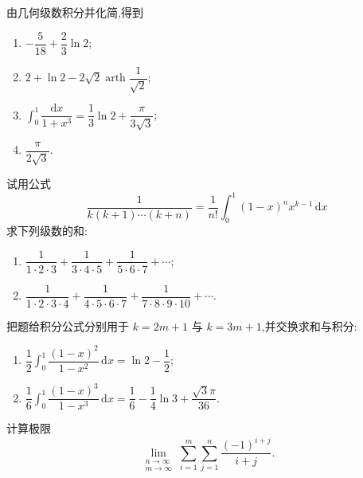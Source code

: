 \begin{solution}
    由几何级数积分并化简,得到
    \begin{enumerate}
        \item $\displaystyle -\dfrac{5}{18}+\dfrac{2}{3}\ln2$;
        \item $\displaystyle 2+\ln2-2\sqrt2\operatorname{arth}\dfrac{1}{\sqrt2}$;
        \item $\displaystyle \int_0^1\dfrac{\mathrm{d}x}{1+x^3}
                  =\dfrac{1}{3}\ln2+\dfrac{\pi}{3\sqrt3}$;
        \item $\displaystyle\dfrac{\pi}{2\sqrt3}$.
    \end{enumerate}
\end{solution}

\begin{example}
    试用公式
    \[
        \dfrac{1}{k(k+1)\cdots(k+n)}
        =\dfrac{1}{n!}\int_0^1(1-x)^nx^{k-1}\,\mathrm{d}x
    \]
    求下列级数的和:
    \begin{enumerate}
        \item $\displaystyle\dfrac{1}{1\cdot2\cdot3}+\dfrac{1}{3\cdot4\cdot5}+\dfrac{1}{5\cdot6\cdot7}+\cdots$;
        \item $\displaystyle\dfrac{1}{1\cdot2\cdot3\cdot4}+\dfrac{1}{4\cdot5\cdot6\cdot7}+\dfrac{1}{7\cdot8\cdot9\cdot10}+\cdots$.
    \end{enumerate}
\end{example}
\exampleblank

\begin{solution}
    把题给积分公式分别用于 $k=2m+1$ 与 $k=3m+1$,并交换求和与积分:
    \begin{enumerate}
        \item $\displaystyle\dfrac{1}{2}\int_0^1\dfrac{(1-x)^2}{1-x^2}\,\mathrm{d}x
                  =\ln2-\dfrac{1}{2}$;
        \item $\displaystyle\dfrac{1}{6}\int_0^1\dfrac{(1-x)^3}{1-x^3}\,\mathrm{d}x
                  =\dfrac{1}{6}-\dfrac{1}{4}\ln3+\dfrac{\sqrt3\pi}{36}$.
    \end{enumerate}
\end{solution}

\begin{example}
    计算极限
    \[
        \lim\limits_{\substack{n\to\infty\\m\to\infty}}
        \sum\limits_{i=1}^{m}\sum\limits_{j=1}^{n}\dfrac{(-1)^{i+j}}{i+j}.
    \]
\end{example}
\exampleblank

